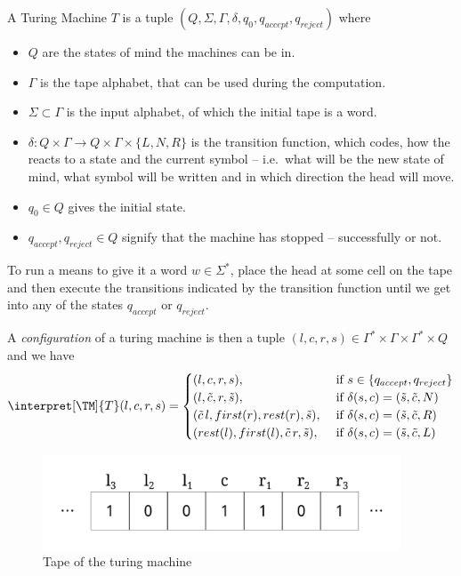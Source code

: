 \begin{defn}
	\label{def:tm}
	A Turing Machine $T$ is a tuple $(Q, \Sigma, \Gamma, \delta, q_0, q_{accept}, q_{reject})$
	where 
	\begin{itemize}
		\item $Q$ are the states of mind the machines can be in.
		\item $\Gamma$ is the tape alphabet, that can be used during the computation.
		\item $\Sigma\subset \Gamma$ is the input alphabet, of which the initial tape is a word.
		\item $\delta:Q\times \Gamma \rightarrow Q\times \Gamma\times \{L, N, R\}$ 
			is the transition function, which codes, how the \TM reacts to a state 
			and the current symbol -- i.e.\ what will be the new state of mind, what 
			symbol will be written and in which direction the head will move.
		\item $q_0\in Q$ gives the initial state.
		\item $q_{accept}, q_{reject}\in Q$ signify that the machine has stopped --
			successfully or not.
	\end{itemize}

	To run a \TM means to give it a word $w\in\Sigma^*$, place the head at some 
	cell on the tape and then execute the transitions indicated by the transition
	function until we get into any of the states $q_{accept}$ or $q_{reject}$.

	A {\em configuration} of a turing machine is then a tuple 
	$(l, c, r, s) \in \Gamma^*\times \Gamma \times \Gamma^*\times Q$ 
	and we have 
	\begin{equation*}
		\interpret[\TM]{T}(l, c, r, s) = \begin{cases}
			(l, c, r, s), &\text{ if } s \in \{q_{accept}, q_{reject}\} \\
			(l, \tilde{c}, r, \tilde{s}) , &\text{ if } \delta(s,c) = (\tilde{s}, \tilde{c}, N)\\
			(\tilde{c}\, l , first(r), rest(r), \tilde{s}) , &\text{ if } \delta(s,c) = (\tilde{s}, \tilde{c}, R)\\
			(rest(l), first(l), \tilde{c}\, r, \tilde{s}) , &\text{ if } \delta(s,c) = (\tilde{s}, \tilde{c}, L)
		\end{cases}
	\end{equation*}

	\begin{figure}[htb]
		\includegraphics[width=0.95\textwidth]{computability/completeness/pictures/turingtape}
		\caption{Tape of the turing machine}
	\end{figure}
\end{defn}

